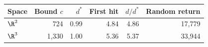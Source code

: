 \begin{tabular}{lrrrrr}
\toprule
Space & Bound $c$ & $d^*$ & First hit & $d/d^*$ & Random return\\
\midrule
$\R^2$ & 724 & 0.99 & 4.84 & 4.86 & 17{,}779\\
$\R^3$ & 1{,}330 & 1.00 & 5.36 & 5.37 & 33{,}944\\
\bottomrule
\end{tabular}
